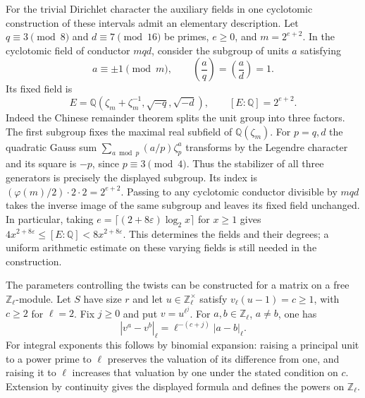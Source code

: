 \documentclass[11pt]{amsart}
\theoremstyle{definition}
\theoremstyle{remark}
\begin{document}
For the trivial Dirichlet character the auxiliary fields in one
cyclotomic construction of these intervals admit an elementary
description. Let $q\equiv3\pmod8$ and $d\equiv7\pmod{16}$ be primes,
$e\ge0$, and $m=2^{e+2}$. In the cyclotomic field of conductor $mqd$,
consider the subgroup of units $a$ satisfying
\[
 a\equiv\pm1\pmod m,\qquad
 \left(\frac{a}{q}\right)=\left(\frac{a}{d}\right)=1.
\]
Its fixed field is
\[
 E=\mathbb Q(\zeta_m+\zeta_m^{-1},\sqrt{-q},\sqrt{-d}),
 \qquad [E:\mathbb Q]=2^{e+2}.
\]
Indeed the Chinese remainder theorem splits the unit group into three
factors. The first subgroup fixes the maximal real subfield of
$\mathbb Q(\zeta_m)$. For $p=q,d$ the quadratic Gauss sum
$\sum_{a\bmod p}(a/p)\zeta_p^a$ transforms by the Legendre character
and its square is $-p$, since $p\equiv3\pmod4$. Thus the stabilizer of
all three generators is precisely the displayed subgroup. Its index is
$(\varphi(m)/2)\cdot2\cdot2=2^{e+2}$. Passing to any cyclotomic
conductor divisible by $mqd$ takes the inverse image of the same
subgroup and leaves its fixed field unchanged. In particular, taking
$e=\lceil(2+8\varepsilon)\log_2 x\rceil$ for $x\ge1$ gives
$4x^{2+8\varepsilon}\le [E:\mathbb Q]<8x^{2+8\varepsilon}$.
This determines the fields and their degrees; a uniform arithmetic
estimate on these varying fields is still needed in the construction.

The parameters controlling the twists can be constructed for a
matrix on a free $\mathbb Z_\ell$-module. Let $S$ have size $r$ and
let $u\in\mathbb Z_\ell^\times$ satisfy $v_\ell(u-1)=c\ge1$,
with $c\ge2$ for $\ell=2$. Fix $j\ge0$ and put $v=u^{\ell^j}$.
For $a,b\in\mathbb Z_\ell$, $a\ne b$, one has
\[
 |v^a-v^b|_\ell=\ell^{-(c+j)}|a-b|_\ell .
\]
For integral exponents this follows by binomial expansion: raising
a principal unit to a power prime to $\ell$ preserves the valuation
of its difference from one, and raising it to $\ell$ increases that
valuation by one under the stated condition on $c$. Extension by
continuity gives the displayed formula and defines the powers on
$\mathbb Z_\ell$.
\end{document}
